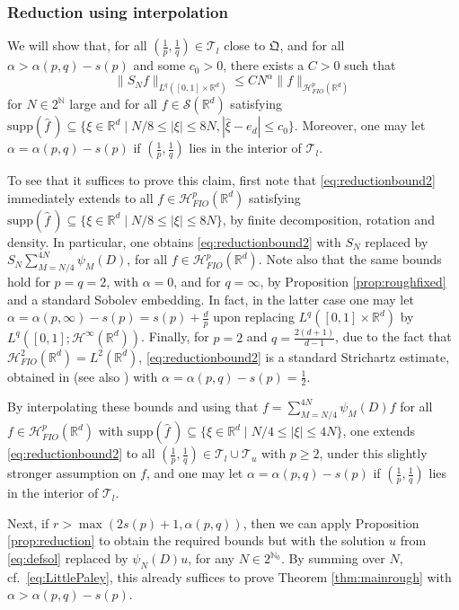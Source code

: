 \documentclass{amsart}
\numberwithin{equation}{section}
\theoremstyle{definition}
\newcommand{\R}{\mathbb{R}}
\newcommand{\Rd}{\mathbb{R}^{d}}
\newcommand{\Rn}{\mathbb{R}^{d}}
\newcommand{\N}{\mathbb{N}}
\newcommand {\HT}{\mathcal{H}}
\newcommand {\Hp}{\mathcal{H}^{p}_{FIO}(\R^d)}
\newcommand {\Sw}{\mathcal{S}}
\newcommand {\supp}{\mathrm{supp}}
\newcommand {\wh}{\widehat}
\begin{document}
\subsubsection*{Reduction using interpolation}

We will show that, for all $(\frac{1}{p},\frac{1}{q})\in \mathcal{T}_{l}$ close to $\mathfrak{Q}$, and for all $\alpha>\alpha(p,q)-s(p)$ and some $c_{0}>0$, there exists a $C>0$ such that 
\begin{equation}\label{eq:reductionbound2}
\|S_{N}f\|_{L^{q}([0,1]\times\Rd)}\leq CN^{\alpha}\|f\|_{\Hp}
\end{equation}
for $N\in 2^{\N}$ large and for all $f\in\Sw(\Rd)$ satisfying $\supp(\wh{f}\,)\subseteq \{\xi\in\Rn\mid N/8\leq |\xi|\leq 8N, |\hat{\xi}-e_{d}|\leq c_{0}\}$.   Moreover, one may let $\alpha=\alpha(p,q)-s(p)$ if $(\frac{1}{p},\frac{1}{q})$ lies in the interior of $\mathcal{T}_{l}$.

To see that it suffices to prove this claim, first note that \eqref{eq:reductionbound2} immediately extends to all $f\in\Hp$ satisfying $\supp(\wh{f}\,)\subseteq \{\xi\in\Rn\mid N/8\leq |\xi|\leq 8N\}$, by finite decomposition, rotation and density. In particular, one obtains \eqref{eq:reductionbound2} with $S_{N}$ replaced by $S_{N}\sum_{M=N/4}^{4N}\psi_{M}(D)$, for all $f\in\Hp$. Note also that the same bounds hold for $p=q=2$, with $\alpha=0$, and for $q=\infty$, by Proposition \ref{prop:roughfixed} and a standard Sobolev embedding. In fact, in the latter case one may let $\alpha=\alpha(p,\infty)-s(p)=s(p)+\frac{d}{p}$ upon replacing $L^{q}([0,1]\times\Rd)$ by $L^{q}([0,1];\HT^{\infty}(\Rd))$. Finally, for $p=2$ and $q=\frac{2(d+1)}{d-1}$, due to the fact that $\HT^{2}_{FIO}(\Rd)=L^{2}(\Rd)$, \eqref{eq:reductionbound2} is a standard Strichartz estimate, obtained in \cite{Tataru2001} (see also \cite[Appendix A]{SchippaTataru2025}) with $\alpha=\alpha(p,q)-s(p)=\frac{1}{2}$.

 By interpolating these bounds and using that $f=\sum_{M=N/4}^{4N}\psi_{M}(D)f$ for all $f\in\Hp$ with $\supp(\wh{f}\,)\subseteq \{\xi\in\Rd\mid N/4\leq |\xi|\leq 4N\}$, one extends \eqref{eq:reductionbound2} to all $(\frac{1}{p},\frac{1}{q})\in \mathcal{T}_{l}\cup \mathcal{T}_{u}$ with $p\geq 2$, under this slightly stronger assumption on $f$, and one may let $\alpha=\alpha(p,q)-s(p)$ if $(\frac{1}{p},\frac{1}{q})$ lies in the interior of $\mathcal{T}_{l}$.

Next, if $r>\max(2s(p)+1,\alpha(p,q))$, then we can apply Proposition \ref{prop:reduction} to obtain the required bounds but with the solution $u$ from \eqref{eq:defsol} replaced by $\psi_{N}(D)u$, for any $N\in 2^{\N_{0}}$. By summing over $N$, cf.~\eqref{eq:LittlePaley}, this already suffices to prove Theorem \ref{thm:mainrough} with $\alpha>\alpha(p,q)-s(p)$.
\end{document}
